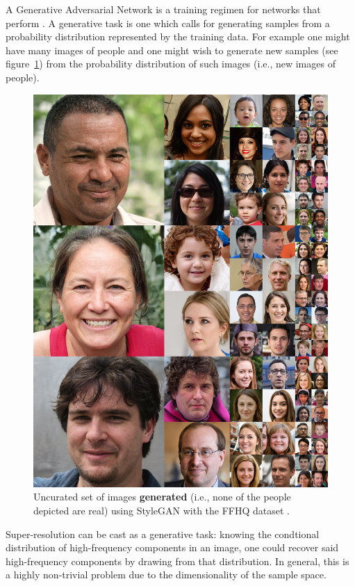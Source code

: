 A Generative Adversarial Network \cite{goodfellow2014generative} is a training regimen for networks that perform .
%
A generative task is one which calls for generating samples from a probability distribution represented by the training data.
%
For example one might have many images of people and one might wish to generate new samples (see figure~\ref{fig:stylegan}) from the probability distribution of such images (i.e., new images of people).
\begin{figure}[!htbp]
    \centering
    \begin{adjustbox}{width=\linewidth}
        \centering
        \includegraphics[]{figures/neural_networks/stylegan.jpg}
    \end{adjustbox}
    \caption{Uncurated set of images \textbf{generated} (i.e., none of the people depicted are real) using StyleGAN with the FFHQ dataset \cite{karras2018stylebased}.}\label{fig:stylegan}
\end{figure}
%
Super-resolution can be cast as a generative task: knowing the condtional distribution of high-frequency components in an image, one could recover said high-frequency components by drawing from that distribution.
%
In general, this is a highly non-trivial problem due to the dimensionality of the sample space.

